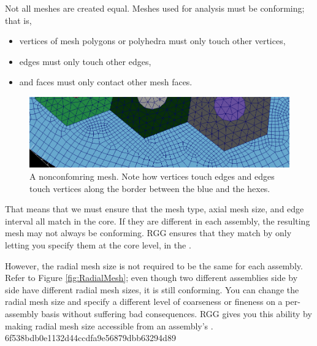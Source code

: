 Not all meshes are created equal.  Meshes used for analysis must be conforming; that is,

\begin{itemize}
	\item{vertices of mesh polygons or polyhedra must only touch other vertices,}
	\item{edges must only touch other edges,}
	\item{and faces must only contact other mesh faces.}
\end{itemize}

\begin{figure}[H]
	\begin{center}
		\includegraphics[width=\linewidth]{Images/nonconforming-mesh.png}
		\caption{A nonconfomring mesh.  Note how vertices touch edges and edges touch vertices along the border between the blue and the hexes.}
		\label{fig:NonconformingMesh}
	\end{center}
\end{figure}

That means that we must ensure that the mesh type, axial mesh size, and edge interval all match in the core.  If they are different in each assembly, the resulting mesh may not always be conforming.  RGG ensures that they match by only letting you specify them at the core level, in the .

However, the radial mesh size is not required to be the same for each assembly.  Refer to Figure \ref{fig:RadialMesh}; even though two different assemblies side by side have different radial mesh sizes, it is still conforming. You can change the radial mesh size and specify a different level of coarseness or fineness on a per-assembly basis without suffering bad consequences.  RGG gives you this ability by making radial mesh size accessible from an assembly's .
6f538bdb0e1132d44ccdfa9e56879dbb63294d89